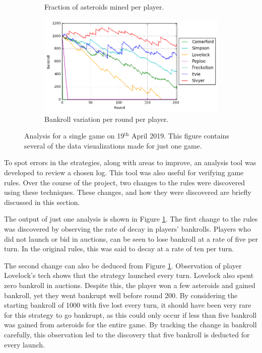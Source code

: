 \documentclass[11pt, twoside]{article}
\begin{document}
\begin{figure}[b!]
\begin{subfigure}[b]{0.39\textwidth}
		\caption{Fraction of asteroids mined per player.}
	\end{subfigure}
	\begin{subfigure}[b]{0.59\textwidth}
		\includegraphics[width=\textwidth]{normgame_bank.png}
		\caption{Bankroll variation per round per player.}
	\end{subfigure}
	\caption{Analysis for a single game on 19$^{\text{th}}$ April 2019. This figure contains several of the data visualizations made for just one game.}
	\label{Analysis1}
\end{figure}

To spot errors in the strategies, along with areas to improve, an analysis tool was developed to review a chosen log. This tool was also useful for verifying game rules. Over the course of the project, two changes to the rules were discovered using these techniques. These changes, and how they were discovered are briefly discussed in this section.

The output of just one analysis is shown in Figure \ref{Analysis1}. The first change to the rules was discovered by observing the rate of decay in players' bankrolls. Players who did not launch or bid in auctions, can be seen to lose bankroll at a rate of five per turn. In the original rules, this was said to decay at a rate of ten per turn.

The second change can also be deduced from Figure \ref{Analysis1}. Observation of player Lovelock's tech shows that the strategy launched every turn. Lovelock also spent zero bankroll in auctions. Despite this, the player won a few asteroids and gained bankroll, yet they went bankrupt well before round 200. By considering the starting bankroll of 1000 with five lost every turn, it should have been very rare for this strategy to go bankrupt, as this could only occur if less than five bankroll was gained from asteroids for the entire game. By tracking the change in bankroll carefully, this observation led to the discovery that five bankroll is deducted for every launch.
\end{document}
